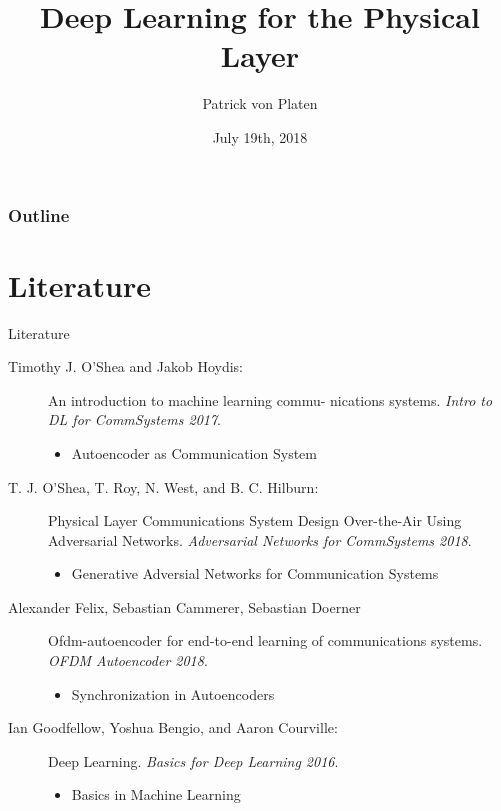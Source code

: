 \documentclass[xcolor=table,mathserif,9pt]{beamer}    %
\title[Seminar]{Deep Learning for the Physical Layer}
\author[Patrick von Platen]{Patrick von Platen}
\institute[RWTH Aachen University] %
{
  \strut Institute for Theoretical Information Technology\\
  \strut Univ.-Prof. Dr. rer. nat. Rudolf Mathar%
}
\date[19/7/2018]{July 19th, 2018}
\begin{document}
\begin{frame}[label=titlepage]
  \titlepage
\end{frame}

\begin{frame}
	\frametitle{Outline}
	\tableofcontents
\end{frame}



\section{Literature}%
\label{sec:literature}


\begin{frame}{Literature}
\begin{description}
\item [Timothy J. O'Shea and Jakob Hoydis:] An introduction to machine learning commu- nications systems. {\em Intro to DL for CommSystems 2017}.
  \begin{itemize}
  \item Autoencoder as Communication System 
  \end{itemize}
\end{description}
\begin{description}
\item [T. J. O'Shea, T. Roy, N. West, and B. C. Hilburn:] Physical Layer Communications System Design Over-the-Air Using Adversarial Networks. {\em Adversarial Networks for CommSystems 2018}.
  \begin{itemize}
  \item Generative Adversial Networks for Communication Systems 
  \end{itemize}
\end{description}
\begin{description}
\item [Alexander Felix, Sebastian Cammerer, Sebastian Doerner] Ofdm-autoencoder for end-to-end learning of communications systems. {\em OFDM Autoencoder 2018}.
  \begin{itemize}
  \item Synchronization in Autoencoders 
  \end{itemize}
\end{description}
\begin{description}
\item [Ian Goodfellow, Yoshua Bengio, and Aaron Courville:] Deep Learning. {\em Basics for Deep Learning 2016}.
  \begin{itemize}
  \item Basics in Machine Learning 
  \end{itemize}
\end{description}
\end{frame}
\end{document}
